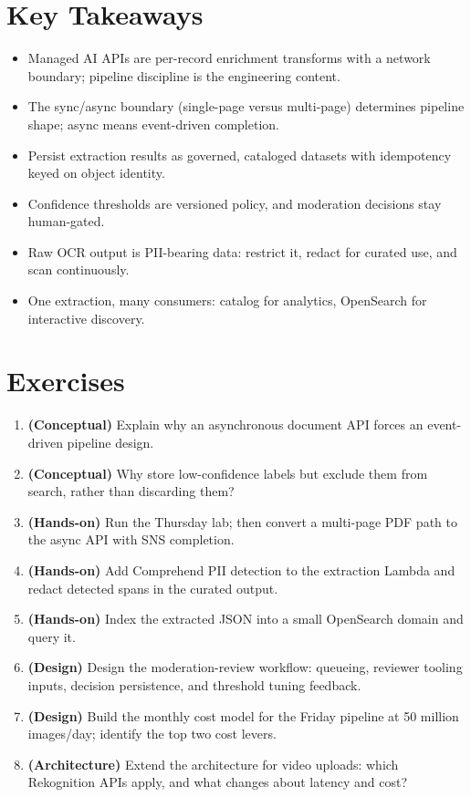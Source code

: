 \section*{Key Takeaways}
\begin{itemize}
    \item Managed AI APIs are per-record enrichment transforms with a network boundary; pipeline discipline is the engineering content.
    \item The sync/async boundary (single-page versus multi-page) determines pipeline shape; async means event-driven completion.
    \item Persist extraction results as governed, cataloged datasets with idempotency keyed on object identity.
    \item Confidence thresholds are versioned policy, and moderation decisions stay human-gated.
    \item Raw OCR output is PII-bearing data: restrict it, redact for curated use, and scan continuously.
    \item One extraction, many consumers: catalog for analytics, OpenSearch for interactive discovery.
\end{itemize}

\section{Exercises}
\begin{enumerate}
    \item \textbf{(Conceptual)} Explain why an asynchronous document API forces an event-driven pipeline design.
    \item \textbf{(Conceptual)} Why store low-confidence labels but exclude them from search, rather than discarding them?
    \item \textbf{(Hands-on)} Run the Thursday lab; then convert a multi-page PDF path to the async API with SNS completion.
    \item \textbf{(Hands-on)} Add Comprehend PII detection to the extraction Lambda and redact detected spans in the curated output.
    \item \textbf{(Hands-on)} Index the extracted JSON into a small OpenSearch domain and query it.
    \item \textbf{(Design)} Design the moderation-review workflow: queueing, reviewer tooling inputs, decision persistence, and threshold tuning feedback.
    \item \textbf{(Design)} Build the monthly cost model for the Friday pipeline at 50 million images/day; identify the top two cost levers.
    \item \textbf{(Architecture)} Extend the architecture for video uploads: which Rekognition APIs apply, and what changes about latency and cost?
\end{enumerate}

